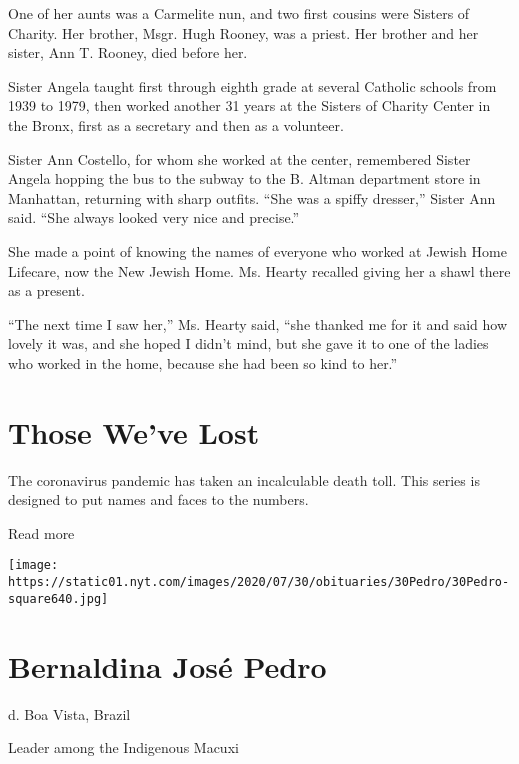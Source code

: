 One of her aunts was a Carmelite nun, and two first cousins were Sisters
of Charity. Her brother, Msgr. Hugh Rooney, was a priest. Her brother
and her sister, Ann T. Rooney, died before her.

Sister Angela taught first through eighth grade at several Catholic
schools from 1939 to 1979, then worked another 31 years at the Sisters
of Charity Center in the Bronx, first as a secretary and then as a
volunteer.

Sister Ann Costello, for whom she worked at the center, remembered
Sister Angela hopping the bus to the subway to the B. Altman department
store in Manhattan, returning with sharp outfits. ``She was a spiffy
dresser,'' Sister Ann said. ``She always looked very nice and precise.''

She made a point of knowing the names of everyone who worked at Jewish
Home Lifecare, now the New Jewish Home. Ms. Hearty recalled giving her a
shawl there as a present.

``The next time I saw her,'' Ms. Hearty said, ``she thanked me for it
and said how lovely it was, and she hoped I didn't mind, but she gave it
to one of the ladies who worked in the home, because she had been so
kind to her.''

\href{https://www.nytimes.com/interactive/2020/obituaries/people-died-coronavirus-obituaries.html?action=click\&pgtype=Article\&state=default\&region=BELOW_MAIN_CONTENT\&context=covid_obits_promo}{}

\hypertarget{those-weve-lost}{%
\section{Those We've Lost}\label{those-weve-lost}}

The coronavirus pandemic has taken an incalculable death toll. This
series is designed to put names and faces to the numbers.

Read more

\texttt{[image: https://static01.nyt.com/images/2020/07/30/obituaries/30Pedro/30Pedro-square640.jpg]}

\hypertarget{bernaldina-josuxe9-pedro}{%
\section{Bernaldina José Pedro}\label{bernaldina-josuxe9-pedro}}

d. Boa Vista, Brazil

Leader among the Indigenous Macuxi

